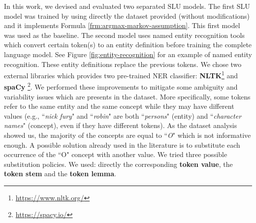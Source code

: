 \documentclass[11pt,a4paper]{article}
\begin{document}
In this work, we devised and evaluated two separated SLU models. 
The first SLU model was trained by using directly the dataset provided (without modifications) and it 
implements Formula \ref{frm:argmax-markov-assumption}. 
This first model was used as the baseline. The second model uses named entity recognition tools which convert certain token(s) to an entity definition before training the complete language model. See Figure \ref{fig:entity-recognition} for an example of named entity recognition. These entity definitions replace the previous tokens. We chose two external libraries which provides two pre-trained NER classifier: \textbf{NLTK}\footnote{\url{https://www.nltk.org/}} and \textbf{spaCy} \footnote{\url{https://spacy.io/}}. 
We performed these improvements to mitigate some ambiguity and variability issues which are presents in the dataset. 
More specifically, some tokens refer to the same entity 
and the same concept while they may have different values 
(e.g., ``\textit{nick fury}" and ``\textit{robin}" are both 
``\textit{persons}" (entity) and ``\textit{character names}" (concept), even if  they have different tokens). 
As the dataset analysis showed us, the majority of the concepts are equal to ``\textit{O}" which is not informative enough. A possible solution already used in the literature is to substitute each occurrence of the  ``O" concept with another value. We tried three possible substitution policies. We used: 
directly the corresponding \textbf{token value}, the \textbf{token stem} and the \textbf{token lemma}.
 
\end{document}
